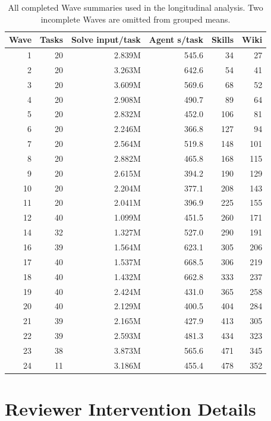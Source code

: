 \begin{table}[H]
\centering
\footnotesize
\renewcommand{\arraystretch}{1.00}
\begin{tabular}{@{}rrrrrr@{}}
\toprule
\rowcolor{papersand}
\textbf{Wave} & \textbf{Tasks} & \textbf{Solve input/task} & \textbf{Agent s/task} & \textbf{Skills} & \textbf{Wiki} \\
\midrule
1  & 20 & 2.839M & 545.6 & 34  & 27  \\
2  & 20 & 3.263M & 642.6 & 54  & 41  \\
3  & 20 & 3.609M & 569.6 & 68  & 52  \\
4  & 20 & 2.908M & 490.7 & 89  & 64  \\
5  & 20 & 2.832M & 452.0 & 106 & 81  \\
6  & 20 & 2.246M & 366.8 & 127 & 94  \\
7  & 20 & 2.564M & 519.8 & 148 & 101 \\
8  & 20 & 2.882M & 465.8 & 168 & 115 \\
9  & 20 & 2.615M & 394.2 & 190 & 129 \\
10 & 20 & 2.204M & 377.1 & 208 & 143 \\
11 & 20 & 2.041M & 396.9 & 225 & 155 \\
12 & 40 & 1.099M & 451.5 & 260 & 171 \\
14 & 32 & 1.327M & 527.0 & 290 & 191 \\
16 & 39 & 1.564M & 623.1 & 305 & 206 \\
17 & 40 & 1.537M & 668.5 & 306 & 219 \\
18 & 40 & 1.432M & 662.8 & 333 & 237 \\
19 & 40 & 2.424M & 431.0 & 365 & 258 \\
20 & 40 & 2.129M & 400.5 & 404 & 284 \\
21 & 39 & 2.165M & 427.9 & 413 & 305 \\
22 & 39 & 2.593M & 481.3 & 434 & 323 \\
23 & 38 & 3.873M & 565.6 & 471 & 345 \\
24 & 11 & 3.186M & 455.4 & 478 & 352 \\
\bottomrule
\end{tabular}
\caption{All completed \systemname Wave summaries used in the longitudinal
analysis. Two incomplete Waves are omitted from grouped means.}
\label{tab:swebench-waves}
\end{table}

\section{Reviewer Intervention Details}

